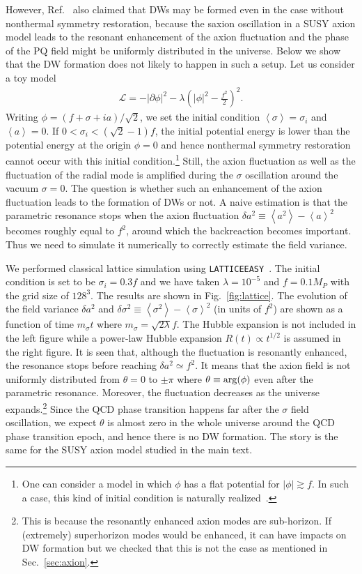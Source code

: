 \documentclass[12pt, a4paper]{article}
\begin{document}
However, Ref.~\cite{Kasuya:1996ns} also claimed that DWs may be formed even in the case without nonthermal symmetry restoration,
because the saxion oscillation in a SUSY axion model leads to the resonant enhancement of the axion fluctuation
and the phase of the PQ field might be uniformly distributed in the universe.
Below we show that the DW formation does not likely to happen in such a setup.
Let us consider a toy model
\begin{align}
	\mathcal L = - \left|\partial \phi \right|^2 - \lambda \left( |\phi|^2 - \frac{f^2}{2} \right)^2.
\end{align}
Writing $\phi = (f + \sigma + ia)/\sqrt{2}$, we set the initial condition $\left<\sigma\right>=\sigma_i$ and $\left<a\right>=0$.
If $0< \sigma_i < (\sqrt 2-1)f$, the initial potential energy is lower than the potential energy at the origin $\phi=0$
and hence nonthermal symmetry restoration cannot occur with this initial condition.\footnote{
	One can consider a model in which $\phi$ has a flat potential for $|\phi| \gtrsim f$. 
	In such a case, this kind of initial condition is naturally realized~\cite{Ema:2016ops}.
}
Still, the axion fluctuation as well as the fluctuation of the radial mode is amplified during the $\sigma$ oscillation around the vacuum $\sigma=0$.
The question is whether such an enhancement of the axion fluctuation leads to the formation of DWs or not.
A naive estimation is that the parametric resonance stops when the axion fluctuation $\delta a^2\equiv \left< a^2 \right> - \left< a \right>^2$
becomes roughly equal to $f^2$, around which the backreaction becomes important.
Thus we need to simulate it numerically to correctly estimate the field variance.

We performed classical lattice simulation using {\tt LATTICEEASY}~\cite{Felder:2000hq}.
The initial condition is set to be $\sigma_i = 0.3 f$ and we have taken $\lambda = 10^{-5}$ and $f = 0.1 M_P$
with the grid size of $128^3$.
The results are shown in Fig.~\ref{fig:lattice}.
The evolution of the field variance $\delta a^2$ and $\delta\sigma^2\equiv \left< \sigma^2 \right> - \left< \sigma \right>^2$
(in units of $f^2$) are shown as a function of time $m_{\sigma}t$ where $m_{\sigma} = \sqrt{2\lambda} f$.
The Hubble expansion is not included in the left figure while
a power-law Hubble expansion $R(t) \propto t^{1/2}$ is assumed in the right figure.
It is seen that, although the fluctuation is resonantly enhanced, the resonance stops before reaching $\delta a^2 \simeq f^2$.
It means that the axion field is not uniformly distributed from $\theta= 0$ to $\pm\pi$ where $\theta \equiv {\rm arg}(\phi)$
even after the parametric resonance.
Moreover, the fluctuation decreases as the universe expands.\footnote{
	This is because the resonantly enhanced axion modes are sub-horizon.
	If (extremely) superhorizon modes would be enhanced, it can have impacts on DW formation but 
	we checked that this is not the case as mentioned in Sec.~\ref{sec:axion}.
}
Since the QCD phase transition happens far after the $\sigma$ field oscillation, we expect $\theta$ is almost zero in
the whole universe around the QCD phase transition epoch, and hence there is no DW formation.
The story is the same for the SUSY axion model studied in the main text.
\end{document}
